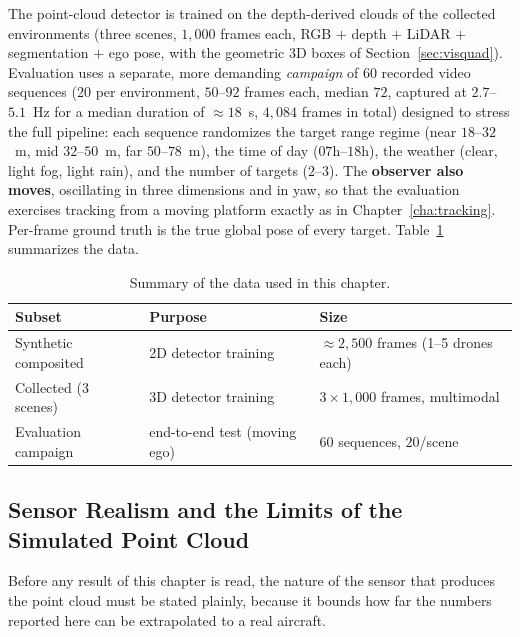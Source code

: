 The point-cloud detector is trained on the depth-derived clouds of the collected
environments (three scenes, $1{,}000$ frames each, RGB $+$ depth $+$ LiDAR $+$
segmentation $+$ ego pose, with the geometric 3D boxes of
Section~\ref{sec:visquad}). Evaluation uses a separate, more demanding
\emph{campaign} of $60$ recorded video sequences ($20$ per environment,
$50$--$92$ frames each, median $72$, captured at $2.7$--$5.1$~Hz for a median
duration of ${\approx}18$~s, $4{,}084$ frames in total) designed to stress the
full pipeline:
each sequence randomizes the target range regime (near $18$--$32$~m, mid
$32$--$50$~m, far $50$--$78$~m), the time of day ($07$h--$18$h), the weather
(clear, light fog, light rain), and the number of targets ($2$--$3$). The
\textbf{observer also moves}, oscillating in three dimensions and in
yaw, so that the evaluation exercises tracking from a moving platform exactly as
in Chapter~\ref{cha:tracking}. Per-frame ground truth is the true global pose of
every target. Table~\ref{tab:dataset} summarizes the data.

\begin{table}[H]
  \centering
  \caption{Summary of the data used in this chapter.}
  \label{tab:dataset}
  \begin{tabular}{@{}lll@{}}
    \toprule
    Subset & Purpose & Size \\
    \midrule
    Synthetic composited & 2D detector training & ${\approx}2{,}500$ frames (1--5 drones each) \\
    Collected (3 scenes) & 3D detector training & $3\times1{,}000$ frames, multimodal \\
    Evaluation campaign  & end-to-end test (moving ego) & $60$ sequences, $20$/scene \\
    \bottomrule
  \end{tabular}
\end{table}

\subsection{Sensor Realism and the Limits of the Simulated Point Cloud}
\label{sec:sensor_caveat}

Before any result of this chapter is read, the nature of the sensor that produces
the point cloud must be stated plainly, because it bounds how far the numbers
reported here can be extrapolated to a real aircraft.

